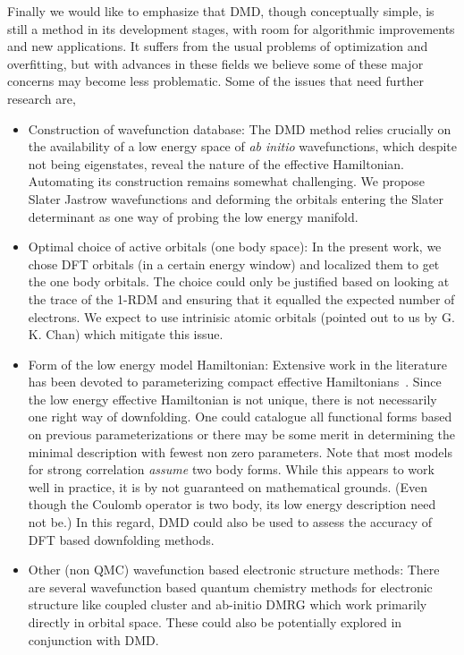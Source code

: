 Finally we would like to emphasize that DMD, though conceptually simple, 
is still a method in its development stages, with room for algorithmic improvements and new applications. It suffers 
from the usual problems of optimization and overfitting, but with advances in these fields we believe some of these major 
concerns may become less problematic. Some of the issues that need further research are,
\begin{itemize} 
	\item Construction of wavefunction database:
	The DMD method relies crucially on the availability of a low energy space of \emph{ab initio} wavefunctions, 
	which despite not being eigenstates, reveal the nature of the effective Hamiltonian. Automating its construction 
	remains somewhat challenging. We propose Slater Jastrow wavefunctions and deforming the orbitals entering the Slater 
	determinant as one way of probing the low energy manifold.
	\item Optimal choice of active orbitals (one body space):
	In the present work, we chose DFT orbitals (in a certain energy window) and localized them to get the one body orbitals. 
	The choice could only be justified based on looking at the trace of the 1-RDM and ensuring that it 
	equalled the expected number of electrons. We expect to use intrinisic atomic orbitals (pointed out to us by G. K. Chan) which 
	mitigate this issue. 
	\item Form of the low energy model Hamiltonian:
	Extensive work in the literature has been devoted to parameterizing compact effective Hamiltonians~\cite{Georges, Oles, Coury}. 
	Since the low energy effective Hamiltonian is not unique, there is not necessarily one right way of downfolding. 
	One could catalogue all functional forms based on previous parameterizations 
	or there may be some merit in determining the minimal description with fewest non zero parameters.
	Note that most models for strong correlation \emph{assume} two body forms. While this appears to work well in practice, 
	it is by not guaranteed on mathematical grounds. (Even though the Coulomb operator is two body, 
	its low energy description need not be.) In this regard, DMD could also be used to assess 
	the accuracy of DFT based downfolding methods.
	\item Other (non QMC) wavefunction based electronic structure methods:
	There are several wavefunction based quantum chemistry 
	methods for electronic structure like coupled cluster and ab-initio DMRG which work primarily 
	directly in orbital space. These could also be potentially explored in conjunction with DMD.
\end{itemize} 

